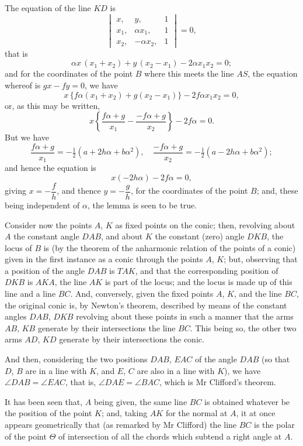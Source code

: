 \documentclass[11pt,a4paper]{article}
\begin{document}
The equation of the line $KD$ is
\[
\begin{vmatrix}
x, & y, & 1 \\
x_1, & \alpha x_1, & 1 \\
x_2, & -\alpha x_2, & 1
\end{vmatrix} = 0,
\]
that is
\[
\alpha x\,(x_1+x_2) + y\,(x_2-x_1) - 2\alpha x_1 x_2 = 0;
\]
and for the coordinates of the point $B$ where this meets the line $AS$, the equation
whereof is $gx-fy=0$, we have
\[
x\,\{f\alpha(x_1+x_2) + g(x_2-x_1)\} - 2f\alpha x_1 x_2 = 0,
\]
or, as this may be written,
\[
x\left\{\frac{f\alpha+g}{x_1} - \frac{-f\alpha+g}{x_2}\right\} - 2f\alpha = 0.
\]
But we have
\[
\frac{f\alpha+g}{x_1} = -\tfrac12(a+2h\alpha+b\alpha^2), \quad
\frac{-f\alpha+g}{x_2} = -\tfrac12(a-2h\alpha+b\alpha^2);
\]
and hence the equation is
\[
x(-2h\alpha) - 2f\alpha = 0,
\]
giving $x = -\dfrac{f}{h}$, and thence $y = -\dfrac{g}{h}$, for the coordinates of the point $B$; and, these
being independent of $\alpha$, the lemma is seen to be true.


Consider now the points $A$, $K$ as fixed points on the conic; then, revolving about
$A$ the constant angle $DAB$, and about $K$ the constant (zero) angle $DKB$, the locus
of $B$ is (by the theorem of the anharmonic relation of the points of a conic) given
in the first instance as a conic through the points $A$, $K$; but, observing that
a position of the angle $DAB$ is $TAK$, and that the corresponding position of $DKB$
is $AKA$, the line $AK$ is part of the locus; and the locus is made up of this line
and a line $BC$. And, conversely, given the fixed points $A$, $K$, and the line $BC$, the
original conic is, by Newton's theorem, described by means of the constant angles
$DAB$, $DKB$ revolving about these points in such a manner that the arms $AB$, $KB$
generate by their intersections the line $BC$. This being so, the other two arms
$AD$, $KD$ generate by their intersections the conic.

And then, considering the two positions $DAB$, $EAC$ of the angle $DAB$ (so that
$D$, $B$ are in a line with $K$, and $E$, $C$ are also in a line with $K$), we have
$\angle DAB = \angle EAC$, that is, $\angle DAE = \angle BAC$, which is Mr Clifford's theorem.

It has been seen that, $A$ being given, the same line $BC$ is obtained whatever
be the position of the point $K$; and, taking $AK$ for the normal at $A$, it at once
appears geometrically that (as remarked by Mr Clifford) the line $BC$ is the polar of
the point $\Theta$ of intersection of all the chords which subtend a right angle at $A$.
\end{document}
